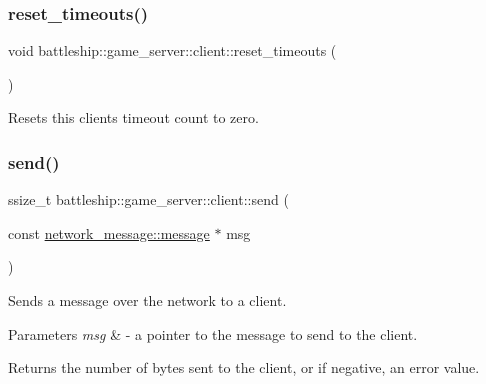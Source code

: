 \subsubsection{\texorpdfstring{reset\+\_\+timeouts()}{reset\_timeouts()}}
{\footnotesize\ttfamily void battleship\+::game\+\_\+server\+::client\+::reset\+\_\+timeouts (\begin{DoxyParamCaption}{ }\end{DoxyParamCaption})\hspace{0.3cm}{\ttfamily [inline]}}

Resets this client\textquotesingle{}s timeout count to zero. \mbox{\label{classbattleship_1_1game__server_1_1client_a9595ac710bf75e615afeee2a463a0872}} 
\subsubsection{\texorpdfstring{send()}{send()}\hspace{0.1cm}{\footnotesize\ttfamily [1/3]}}
{\footnotesize\ttfamily ssize\+\_\+t battleship\+::game\+\_\+server\+::client\+::send (\begin{DoxyParamCaption}\item[{const \hyperlink{classbattleship_1_1network__message_1_1message}{network\+\_\+message\+::message} $\ast$}]{msg }\end{DoxyParamCaption})\hspace{0.3cm}{\ttfamily [inline]}}

Sends a message over the network to a client.


\begin{DoxyParams}{Parameters}
{\em msg} & -\/ a pointer to the message to send to the client.\\
\hline
\end{DoxyParams}
\begin{DoxyReturn}{Returns}
the number of bytes sent to the client, or if negative, an error value. 
\end{DoxyReturn}
\mbox{\label{classbattleship_1_1game__server_1_1client_a53b00e5370ae2f161784172eab1a9fdc}} 
